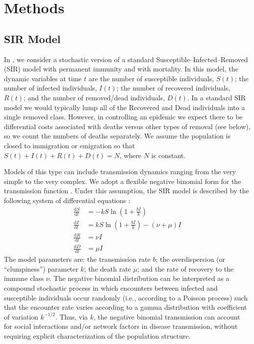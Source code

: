 \documentclass[shortnames,nojss]{jss}
\begin{document}

\section{Methods}
\label{sec:methods}

\subsection{SIR Model}
\label{sec:sirmodel}

In , we consider a stochastic version of a standard
Susceptible--Infected--Removed (SIR) model
\citep{anderson91,hetchote00} with permanent immunity and with
mortality. In this model, the dynamic variables at time $t$ are the
number of susceptible individuals, $S(t)$; the number of infected
individuals, $I(t)$; the number of recovered individuals, $R(t)$; and
the number of removed/dead individuals, $D(t)$. In a standard SIR
model we would typically lump all of the Recovered and Dead
individuals into a single removed class. However, in controlling an
epidemic we expect there to be differential costs associated with
deaths versus other types of removal (see below), so we count the
numbers of deaths separately. We assume the population is closed to
immigration or emigration so that $S(t)+I(t)+R(t)+D(t)=N$, where $N$
is constant.

Models of this type can include transmission dynamics ranging from the
very simple to the very complex. We adopt a flexible negative binomial
form for the transmission function
\citep{godfray89,mangel06,mccallum01}. Under this assumption, the SIR
model is described by the following system of differential equations
\citep{hetchote00,mccallum01}:
\begin{align}
  \frac{\mathrm{d}S}{\mathrm{d}t} &=
-kS \ln\left(1+\frac{bI}{k}\right) \label{dS} \\
  \frac{\mathrm{d}I}{\mathrm{d}t} &= 
kS \ln\left(1+\frac{bI}{k}\right) - (\nu+\mu) I \nonumber \\
  \frac{\mathrm{d}R}{\mathrm{d}t} &= \nu I \label{dR}\\
  \frac{\mathrm{d}D}{\mathrm{d}t} &= \mu I \label{dD}
\end{align}
The model parameters are: the transmission rate $b$; the
overdispersion (or ``clumpiness'') parameter $k$; the death rate
$\mu$; and the rate of recovery to the immune class $\nu$. The
negative binomial distribution can be interpreted as a compound
stochastic process in which encounters between infected and
susceptible individuals occur randomly (i.e., according to a Poisson
process) such that the encounter rate varies according to a gamma
distribution with coefficient of variation $k^{-1/2}$.  Thus, via $k$,
the negative binomial transmission can account for social interactions
and/or network factors in disease transmission, without requiring
explicit characterization of the population structure.
\end{document}

